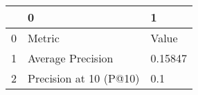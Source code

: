 \begin{tabular}{lll}
\toprule
{} &                       0 &        1 \\
\midrule
0 &                  Metric &    Value \\
1 &       Average Precision &  0.15847 \\
2 &  Precision at 10 (P@10) &      0.1 \\
\bottomrule
\end{tabular}
